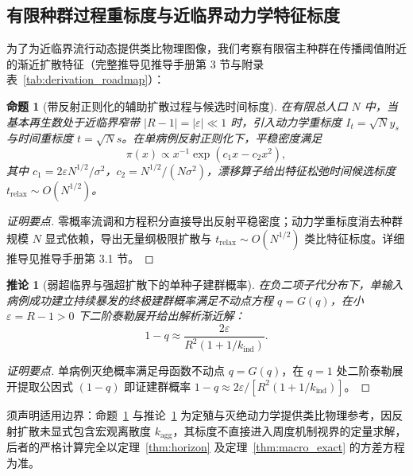 \documentclass[10pt,a4paper]{article}
\theoremstyle{plain}
\newtheorem{proposition}{命题}
\newtheorem{corollary}{推论}
\theoremstyle{definition}
\begin{document}
\subsection{有限种群过程重标度与近临界动力学特征标度}\label{sec:qsd}

为了为近临界流行动态提供类比物理图像，我们考察有限宿主种群在传播阈值附近的渐近扩散特征（完整推导见推导手册第 3 节与附录表~\ref{tab:derivation_roadmap}）：

\begin{proposition}[带反射正则化的辅助扩散过程与候选时间标度]\label{prop:qsd}
在有限总人口 $N$ 中，当基本再生数处于近临界窄带 $|R-1| = |\varepsilon| \ll 1$ 时，引入动力学重标度 $I_t = \sqrt{N} y_s$ 与时间重标度 $t = \sqrt{N} s$。在单病例反射正则化下，平稳密度满足
\begin{equation}
\pi(x) \propto x^{-1} \exp(c_1 x - c_2 x^2), \label{eq:qsd_density}
\end{equation}
其中 $c_1 = 2\varepsilon N^{1/2}/\sigma^2$，$c_2 = N^{1/2}/(N\sigma^2)$，漂移算子给出特征松弛时间候选标度 $t_{\text{relax}} \sim O(N^{1/2})$。
\end{proposition}

\begin{proof}[证明要点]
零概率流调和方程积分直接导出反射平稳密度；动力学重标度消去种群规模 $N$ 显式依赖，导出无量纲极限扩散与 $t_{\text{relax}} \sim O(N^{1/2})$ 类比特征标度。详细推导见推导手册第 3.1 节。
\end{proof}

\begin{corollary}[弱超临界与强超扩散下的单种子建群概率]\label{cor:establishment}
在负二项子代分布下，单输入病例成功建立持续暴发的终极建群概率满足不动点方程 $q = G(q)$，在小 $\varepsilon = R-1 > 0$ 下二阶泰勒展开给出解析渐近解：
\begin{equation}
1 - q \approx \frac{2\varepsilon}{R^2(1 + 1/k_{\text{ind}})}.
\label{eq:pgf_fixed_point}
\end{equation}
\end{corollary}

\begin{proof}[证明要点]
单病例灭绝概率满足母函数不动点 $q = G(q)$，在 $q=1$ 处二阶泰勒展开提取公因式 $(1-q)$ 即证建群概率 $1-q \approx 2\varepsilon/[R^2(1+1/k_{\text{ind}})]$。
\end{proof}

须声明适用边界：命题~\ref{prop:qsd} 与推论~\ref{cor:establishment} 为定殖与灭绝动力学提供类比物理参考，因反射扩散未显式包含宏观离散度 $k_{\text{agg}}$，其标度不直接进入周度机制视界的定量求解，后者的严格计算完全以定理~\ref{thm:horizon} 及定理~\ref{thm:macro_exact} 的方差方程为准。
\end{document}
